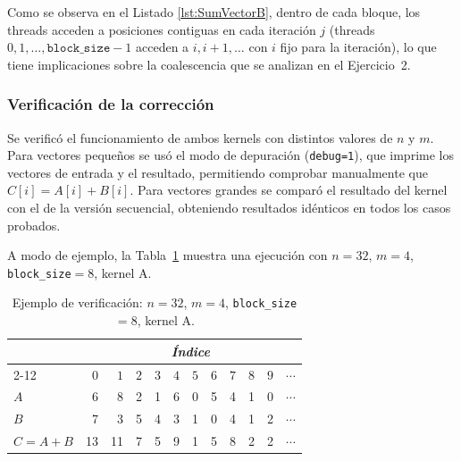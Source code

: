\documentclass[12pt]{article}
\newenvironment{exercise}[2][Ejercicio]{\begin{trivlist}
\item[\hskip \labelsep {\bfseries #1}\hskip \labelsep {\bfseries #2.}]}{\end{trivlist}}
\begin{document}
\begin{exercise}{1}
    Como se observa en el Listado \ref{lst:SumVectorB}, dentro de cada bloque, los threads acceden a
    posiciones contiguas en cada iteración $j$ (threads $0, 1, \ldots, \texttt{block\_size}-1$
    acceden a $i, i+1, \ldots$ con $i$ fijo para la iteración), lo que tiene implicaciones sobre la
    coalescencia que se analizan en el Ejercicio~2.

    \subsubsection*{Verificación de la corrección}

    Se verificó el funcionamiento de ambos kernels con distintos valores de $n$ y $m$. Para
    vectores pequeños se usó el modo de depuración (\texttt{debug=1}), que imprime los vectores
    de entrada y el resultado, permitiendo comprobar manualmente que $C[i] = A[i] + B[i]$.
    Para vectores grandes se comparó el resultado del kernel con el de la versión secuencial,
    obteniendo resultados idénticos en todos los casos probados.

    A modo de ejemplo, la Tabla~\ref{tab:verificacion} muestra una ejecución con $n=32$, $m=4$,
    \texttt{block\_size}$=8$, kernel A.

    \begin{table}[h]
        \centering
        \begin{tabular}{l *{11}{r}}
            \toprule
                    & \multicolumn{11}{c}{\textit{Índice}}                                                                  \\
            \cmidrule(l){2-12}
                    & $0$                                  & $1$ & $2$ & $3$ & $4$ & $5$ & $6$ & $7$ & $8$ & $9$ & $\cdots$ \\
            \midrule
            $A$     & 6                                    & 8   & 2   & 1   & 6   & 0   & 5   & 4   & 1   & 0   & $\cdots$ \\
            $B$     & 7                                    & 3   & 5   & 4   & 3   & 1   & 0   & 4   & 1   & 2   & $\cdots$ \\
            $C=A+B$ & 13                                   & 11  & 7   & 5   & 9   & 1   & 5   & 8   & 2   & 2   & $\cdots$ \\
            \bottomrule
        \end{tabular}
        \caption{Ejemplo de verificación: $n=32$, $m=4$, \texttt{block\_size}$=8$, kernel A.}
        \label{tab:verificacion}
    \end{table}

\end{exercise}
\end{document}
